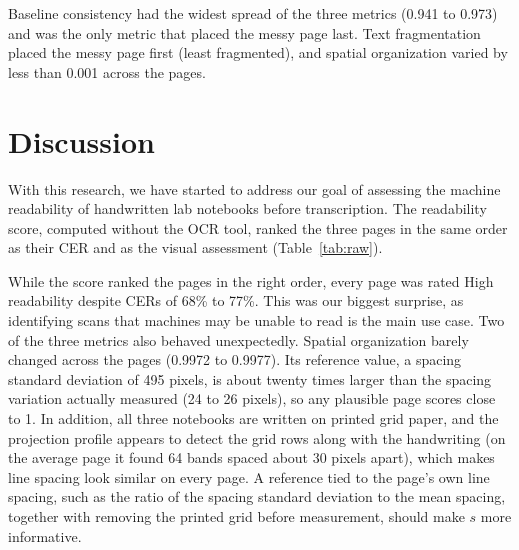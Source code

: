 Baseline consistency had the widest spread of the three metrics (0.941 to
0.973) and was the only metric that placed the messy page last. Text
fragmentation placed the messy page first (least fragmented), and spatial
organization varied by less than 0.001 across the pages.


\section{Discussion}

With this research, we have started to address our goal of assessing the
machine readability of handwritten lab notebooks before transcription. The
readability score, computed without the OCR tool, ranked the three pages in
the same order as their CER and as the visual assessment (Table~\ref{tab:raw}).

While the score ranked the pages in the right order, every page was rated High
readability despite CERs of 68\% to 77\%. This was our biggest surprise, as
identifying scans that machines may be unable to read is the main use case.
Two of the three metrics also behaved unexpectedly. Spatial organization
barely changed across the pages (0.9972 to 0.9977). Its reference value,
a spacing standard deviation of 495 pixels, is about twenty times larger than
the spacing variation actually measured (24 to 26 pixels), so any plausible
page scores close to 1. In addition, all three notebooks are written on
printed grid paper, and the projection profile appears to detect the grid
rows along with the handwriting (on the average page it found 64 bands spaced
about 30 pixels apart), which makes line spacing look similar on every page.
A reference tied to the page's own line spacing, such as the ratio of the
spacing standard deviation to the mean spacing, together with removing the
printed grid before measurement, should make $s$ more informative.

